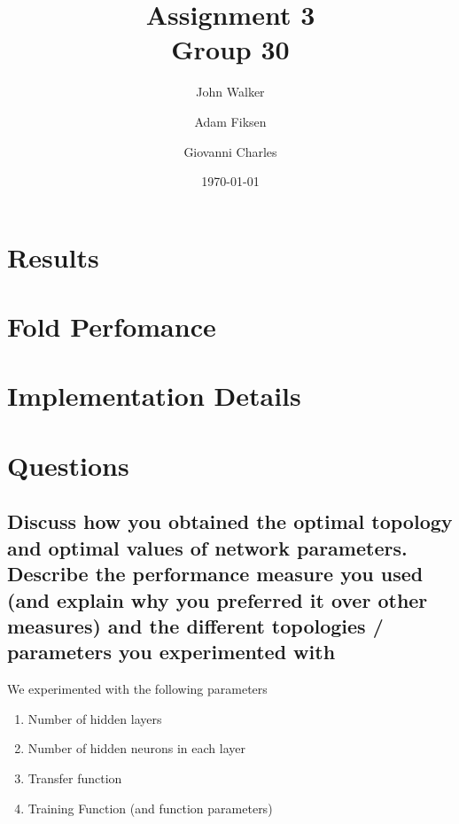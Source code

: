 \documentclass[11pt]{article}
\begin{document}
\title{Assignment 3 \\ Group 30  }

\author{John Walker \and Adam Fiksen \and Giovanni Charles }

\date{\today}         %

\maketitle           %


\section{Results}
\section{Fold Perfomance}
\section{Implementation Details}
\section{Questions}

\subsection{Discuss how you obtained the optimal topology and optimal values of network parameters. Describe the performance measure you used (and explain why you preferred it over other measures) and the different topologies / parameters you experimented with}



We experimented with the following parameters
\begin{enumerate}
  \item Number of hidden layers
  \item Number of hidden neurons in each layer
  \item Transfer function
  \item Training Function (and function parameters)
\end{enumerate}
\end{document}
